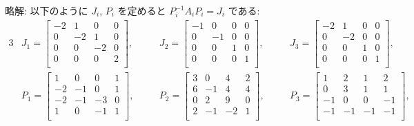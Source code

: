 \documentclass[12pt,twoside]{jarticle}
\newcommand\commentout[1]{#1}
\newcommand\commentout[1]{}
\begin{document}
\commentout{
\medskip
\noindent
略解: 以下のように $J_i$, $P_i$ を定めると $P_i^{-1}A_iP_i=J_i$ である:
{\small
\begin{alignat*}{3}
  &
  J_1 =
  \begin{bmatrix}
    -2 &  1 &  0 &  0 \\
     0 & -2 &  1 &  0 \\
     0 &  0 & -2 &  0 \\
     0 &  0 &  0 &  2 \\
  \end{bmatrix},
  & \quad &
  J_2 =
  \begin{bmatrix}
    -1 &  0 &  0 &  0 \\
     0 & -1 &  0 &  0 \\
     0 &  0 &  1 &  0 \\
     0 &  0 &  0 &  1 \\
  \end{bmatrix},
  & \quad &
  J_3 =
  \begin{bmatrix}
    -2 &  1 &  0 &  0 \\
     0 & -2 &  0 &  0 \\
     0 &  0 &  1 &  0 \\
     0 &  0 &  0 &  1 \\
  \end{bmatrix},
  \\ &
  P_1 =
  \begin{bmatrix}
     1 &  0 &  0 &  1 \\
    -2 & -1 &  0 &  1 \\
    -2 & -1 & -3 &  0 \\
     1 &  0 & -1 &  1 \\
  \end{bmatrix},
  & \quad &
  P_2 =
  \begin{bmatrix}
     3 &  0 &  4 &  2 \\
     6 & -1 &  4 &  4 \\
     0 &  2 &  9 &  0 \\
     2 & -1 & -2 &  1 \\
  \end{bmatrix},
  & \quad &
  P_3 =
  \begin{bmatrix}
     1 &  2 &  1 &  2 \\
     0 &  3 &  1 &  1 \\
    -1 &  0 &  0 & -1 \\
    -1 & -1 & -1 & -1 \\
  \end{bmatrix},
\end{alignat*}
}}
\end{document}
